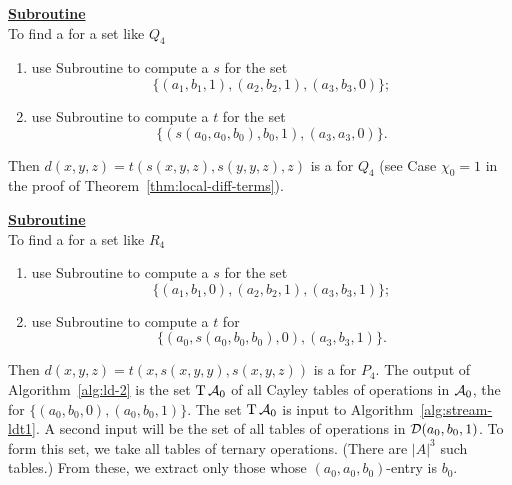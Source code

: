   \medskip
  
  \noindent \underline{\textbf{Subroutine }}\\[4pt]
  To find a \ldto for a set like $Q_4$
  \begin{enumerate}
  \item
  use Subroutine  to compute a \ldto $s$ for the set
  \begin{equation*}
  \{(a_1, b_1, 1), (a_2, b_2, 1), (a_3, b_3, 0)\};
  \end{equation*}
  \item  use Subroutine  to compute a \ldto $t$
  for the set
  \begin{equation*}
  \{(s(a_0, a_0, b_0), b_0, 1),  (a_3,a_3,0)\}.
  \end{equation*}
  \end{enumerate}
  Then
  $d(x,y,z) = t(s(x,y,z), s(y,y,z),z)$
  is a \ldto  for $Q_4$ (see Case $\chi_0=1$ in the proof of Theorem~\ref{thm:local-diff-terms}).
  
  
  \medskip
  
  \noindent \underline{\textbf{Subroutine }}\\[4pt]
  To find a \ldto for a set like $R_4$
  \begin{enumerate}
  \item
  use Subroutine  to compute a \ldto $s$ for the set
  \begin{equation*}
  \{(a_1, b_1, 0), (a_2, b_2, 1), (a_3, b_3, 1)\};
  \end{equation*}
  \item use Subroutine  to compute a \ldto $t$ for
  \begin{equation*}
  \{(a_0, s(a_0, b_0, b_0), 0), (a_3, b_3, 1)\}.
  \end{equation*}
  \end{enumerate}
  Then
  $d(x,y,z) = t(x, s(x,y,y), s(x,y,z))$
  is a \ldto for $P_4$.
  The output of Algorithm~\ref{alg:ld-2} is the set $\operatorname{T} \mathcal{A}_0$ of all 
Cayley tables of operations in $\mathcal{A}_0$, the \ldtos for $\{(a_0, b_0, 0), (a_0, b_0, 1)\}$.
The set $\operatorname{T} \mathcal{A}_0$ is input to Algorithm~\ref{alg:stream-ldt1}.
A second input will be the set of all tables of operations in 
$\mathcal{D} (a_0, b_0, 1)$.  To form this set, we take all tables of ternary operations.
(There are $|A|^3$ such tables.) From these, we extract only those whose 
$(a_0, a_0, b_0)$-entry is $b_0$.

